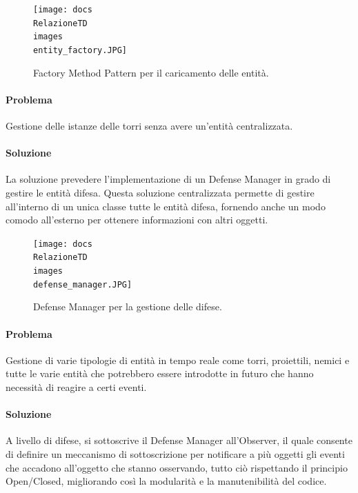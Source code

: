 \documentclass[a4paper,12pt]{report}
\begin{document}
\begin{figure}[H]
    \centering
    \texttt{[image: docs\\RelazioneTD\\images\\entity\_factory.JPG]}
    \caption{Factory Method Pattern per il caricamento delle entità.}
    \label{fig:entity-factory-method}
\end{figure}
\vspace{70mm}

\paragraph{Problema}
Gestione delle istanze delle torri senza avere un'entità centralizzata.
\paragraph{Soluzione}
La soluzione prevedere l'implementazione di un Defense Manager in grado di gestire le entità difesa. Questa soluzione centralizzata permette di gestire all'interno di un unica classe tutte le entità difesa, fornendo anche un modo comodo all'esterno per ottenere informazioni con altri oggetti.

\begin{figure}[H]
    \centering
    \texttt{[image: docs\\RelazioneTD\\images\\defense\_manager.JPG]}
    \caption{Defense Manager per la gestione delle difese.}
    \label{fig:defense-manager}
\end{figure}

\vspace{50mm}
\paragraph{Problema}
Gestione di varie tipologie di entità in tempo reale come torri, proiettili, nemici e tutte le varie entità che potrebbero essere introdotte in futuro che hanno necessità di reagire a certi eventi.
\paragraph{Soluzione}
A livello di difese, si sottoscrive il Defense Manager all'Observer, il quale consente di definire un meccanismo di sottoscrizione per notificare a più oggetti gli eventi che accadono all'oggetto che stanno osservando, tutto ciò rispettando il principio Open/Closed, migliorando così la modularità e la manutenibilità del codice.
\end{document}
